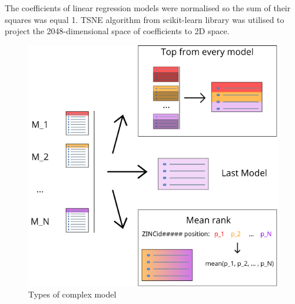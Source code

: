 The coefficients of linear regression models were normalised so the sum of their squares was equal 1.
TSNE algorithm from scikit-learn library was utilised to project the 2048-dimensional space of coefficients to 2D space. 

\begin{figure}[H]
    \centering
    \includegraphics[scale=0.8]{Images/image2.png}
    \caption{Types of complex model}
    \label{ComplexModels}
\end{figure}